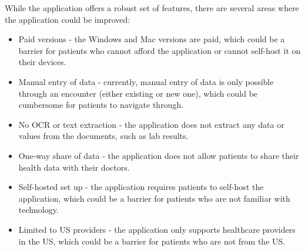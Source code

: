 While the application offers a robust set of features, there are several areas where the application could be improved:

\begin{itemize}
    \item Paid versions - the Windows and Mac versions are paid, which could be a barrier for patients who cannot afford the application or cannot self-host it on their devices.
    \item Manual entry of data - currently, manual entry of data is only possible through an encounter (either existing or new one), which could be cumbersome for patients to navigate through.
    \item No OCR or text extraction - the application does not extract any data or values from the documents, such as lab results.
    \item One-way share of data - the application does not allow patients to share their health data with their doctors.
    \item Self-hosted set up - the application requires patients to self-host the application, which could be a barrier for patients who are not familiar with technology.
    \item Limited to US providers - the application only supports healthcare providers in the US, which could be a barrier for patients who are not from the US.
\end{itemize}